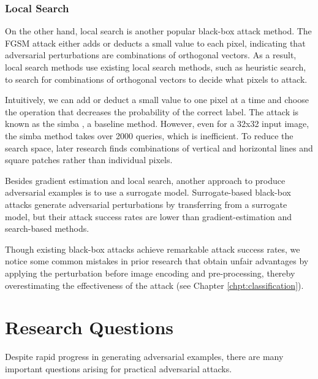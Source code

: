 
\subsubsection{Local Search}

On the other hand, local search is another popular black-box attack method. The FGSM attack either adds or deducts a small value to each pixel, indicating that adversarial perturbations are combinations of orthogonal vectors. As a result, local search methods use existing local search methods, such as heuristic search, to search for combinations of orthogonal vectors to decide what pixels to attack.

Intuitively, we can add or deduct a small value to one pixel at a time and choose the operation that decreases the probability of the correct label. The attack is known as the \acrfull{simba} \cite{guo2019simple}, a baseline method. However, even for a 32x32 input image, the \acrshort{simba} method takes over 2000 queries, which is inefficient. To reduce the search space, later research finds combinations of vertical and horizontal lines and square patches rather than individual pixels.


Besides gradient estimation and local search, another approach to produce adversarial examples is to use a surrogate model. Surrogate-based black-box attacks generate adversarial perturbations by transferring from a surrogate model, but their attack success rates are lower than gradient-estimation and search-based methods.

Though existing black-box attacks achieve remarkable attack success rates, we notice some common mistakes in prior research that obtain unfair advantages by applying the perturbation before image encoding and pre-processing, thereby overestimating the effectiveness of the attack (see Chapter \ref{chpt:classification}).

\section{Research Questions}
\label{sec:research_question}

Despite rapid progress in generating adversarial examples, there are many important questions arising for practical adversarial attacks.

